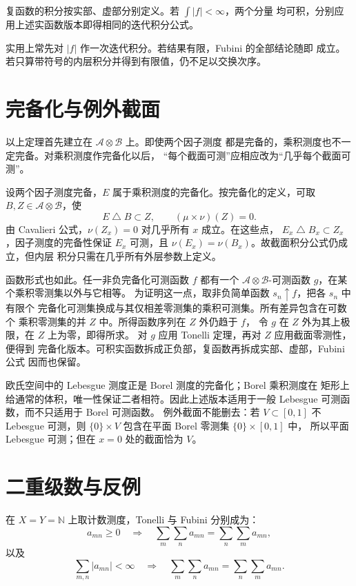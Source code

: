复函数的积分按实部、虚部分别定义。若 \(\int|f|<\infty\)，两个分量
均可积，分别应用上述实函数版本即得相同的迭代积分公式。

实用上常先对 \(|f|\) 作一次迭代积分。若结果有限，Fubini 的全部结论随即
成立。若只算带符号的内层积分并得到有限值，仍不足以交换次序。

\section{完备化与例外截面}

以上定理首先建立在 \(\mathcal A\otimes\mathcal B\) 上。即使两个因子测度
都是完备的，乘积测度也不一定完备。对乘积测度作完备化以后，
“每个截面可测”应相应改为“几乎每个截面可测”。

设两个因子测度完备，\(E\) 属于乘积测度的完备化。按完备化的定义，可取
\(B,Z\in\mathcal A\otimes\mathcal B\)，使
\[
 E\mathbin{\triangle}B\subset Z,\qquad(\mu\times\nu)(Z)=0.
\]
由 Cavalieri 公式，\(\nu(Z_x)=0\) 对几乎所有 \(x\) 成立。在这些点，
\(E_x\mathbin{\triangle}B_x\subset Z_x\)，因子测度的完备性保证
\(E_x\) 可测，且 \(\nu(E_x)=\nu(B_x)\)。故截面积分公式仍成立，但内层
积分只需在几乎所有外层参数上定义。

函数形式也如此。任一非负完备化可测函数 \(f\) 都有一个
\(\mathcal A\otimes\mathcal B\)-可测函数 \(g\)，在某个乘积零测集以外与它相等。
为证明这一点，取非负简单函数 \(s_n\uparrow f\)，把各 \(s_n\) 中有限个
完备化可测集换成与其仅相差零测集的乘积可测集。所有差异包含在可数个
乘积零测集的并 \(Z\) 中。所得函数序列在 \(Z\) 外仍趋于 \(f\)，
令 \(g\) 在 \(Z\) 外为其上极限，在 \(Z\) 上为零，即得所求。
对 \(g\) 应用 Tonelli 定理，再对 \(Z\) 应用截面零测性，便得到
完备化版本。可积实函数拆成正负部，复函数再拆成实部、虚部，Fubini 公式
因而也保留。

欧氏空间中的 Lebesgue 测度正是 Borel 测度的完备化；Borel 乘积测度在
矩形上给通常的体积，唯一性保证二者相符。因此上述版本适用于一般
Lebesgue 可测函数，而不只适用于 Borel 可测函数。
例外截面不能删去：若 \(V\subset[0,1]\) 不 Lebesgue 可测，则
\(\{0\}\times V\) 包含在平面 Borel 零测集 \(\{0\}\times[0,1]\) 中，
所以平面 Lebesgue 可测；但在 \(x=0\) 处的截面恰为 \(V\)。

\section{二重级数与反例}

在 \(X=Y=\mathbb N\) 上取计数测度，Tonelli 与 Fubini 分别成为：
\[
 a_{mn}\ge0\quad\Longrightarrow\quad
 \sum_m\sum_na_{mn}=\sum_n\sum_ma_{mn},
\]
以及
\[
 \sum_{m,n}|a_{mn}|<\infty
 \quad\Longrightarrow\quad
 \sum_m\sum_na_{mn}=\sum_n\sum_ma_{mn}.
\]

